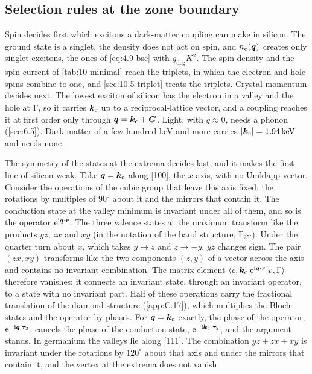 \subsection{Selection rules at the zone boundary}\label{sec:10.5-rules}

Spin decides first which excitons a dark-matter coupling can make in silicon. The ground state is a singlet, the density does not act on spin, and $n_e(\bm{q})$ creates only singlet excitons, the ones of \cref{eq:4.9-bse} with $g_{\mathrm{deg}}K^{\mathrm{x}}$. The spin density and the spin current of \cref{tab:10-minimal} reach the triplets, in which the electron and hole spins combine to one, and \cref{sec:10.5-triplet} treats the triplets. Crystal momentum decides next. The lowest exciton of silicon has the electron in a valley and the hole at $\mathrm{\Gamma}$, so it carries $\bm{k}_{\mathrm{c}}$ up to a reciprocal-lattice vector, and a coupling reaches it at first order only through $\bm{q} = \bm{k}_{\mathrm{c}} + \bm{G}$. Light, with $q \approx 0$, needs a phonon (\cref{sec:6.5}). Dark matter of a few hundred keV and more carries $|\bm{k}_{\mathrm{c}}| = \SI{1.94}{keV}$ and needs none.

The symmetry of the states at the extrema decides last, and it makes the first line of silicon weak. Take $\bm{q} = \bm{k}_{\mathrm{c}}$ along [100], the $x$ axis, with no Umklapp vector. Consider the operations of the cubic group that leave this axis fixed: the rotations by multiples of $90^\circ$ about it and the mirrors that contain it. The conduction state at the valley minimum is invariant under all of them, and so is the operator $\mathrm{e}^{\mathrm{i}\bm{q}\cdot\bm{r}}$. The three valence states at the maximum transform like the products $yz$, $zx$ and $xy$ (in the notation of the band structure, $\mathrm{\Gamma}_{25'}$). Under the quarter turn about $x$, which takes $y \to z$ and $z \to -y$, $yz$ changes sign. The pair $(zx, xy)$ transforms like the two components $(z, y)$ of a vector across the axis and contains no invariant combination. The matrix element $\langle c,\bm{k}_{\mathrm{c}}|\mathrm{e}^{\mathrm{i}\bm{q}\cdot\bm{r}}|v,\mathrm{\Gamma}\rangle$ therefore vanishes: it connects an invariant state, through an invariant operator, to a state with no invariant part. Half of these operations carry the fractional translation of the diamond structure (\cref{app:C.17}), which multiplies the Bloch states and the operator by phases. For $\bm{q} = \bm{k}_{\mathrm{c}}$ exactly, the phase of the operator, $\mathrm{e}^{-\mathrm{i}\bm{q}\cdot\bm{\tau}_2}$, cancels the phase of the conduction state, $\mathrm{e}^{-\mathrm{i}\bm{k}_{\mathrm{c}}\cdot\bm{\tau}_2}$, and the argument stands. In germanium the valleys lie along [111]. The combination $yz + zx + xy$ is invariant under the rotations by $120^\circ$ about that axis and under the mirrors that contain it, and the vertex at the extrema does not vanish.

